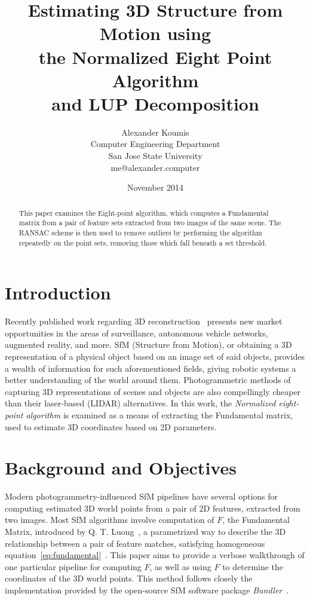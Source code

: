 \documentclass[12pt]{article}
\begin{document}
\title{Estimating 3D Structure from Motion using\\
the Normalized Eight Point Algorithm\\
and LUP Decomposition\\}
\author{Alexander Koumis\\
Computer Engineering Department\\
San Jose State University\\
me@alexander.computer}
\date{November 2014}
\maketitle

\begin{abstract}
This paper examines the Eight-point algorithm, which computes a Fundamental matrix from a pair of feature sets extracted from two images of the same scene. The RANSAC scheme is then used to remove outliers by performing the algorithm repeatedly on the point sets, removing those which fall beneath a set threshold.
\end{abstract}

\newpage

\section{Introduction}
Recently published work regarding 3D reconstruction~\cite{Hartley2004} presents new market opportunities in the areas of surveillance, autonomous vehicle networks, augmented reality, and more. SfM (Structure from Motion), or obtaining a 3D representation of a physical object based on an image set of said objects, provides a wealth of information for such aforementioned fields, giving robotic systems a better understanding of the world around them. Photogrammetric methods of capturing 3D representations of scenes and objects are also compellingly cheaper than their laser-based (LIDAR) alternatives.
In this work, the \textit{Normalized eight-point algorithm} is examined as a means of extracting the Fundamental matrix, used to estimate 3D coordinates based on 2D parameters.

\section{Background and Objectives}
Modern photogrammetry-influenced SfM pipelines have several options for computing estimated 3D world points from a pair of 2D features, extracted from two images. Most SfM algorithms involve computation of $F$, the Fundamental Matrix, introduced by Q. T. Luong~\cite{AICPub329:1992}, a parametrized way to describe the 3D relationship between a pair of feature matches, satisfying homogeneous equation~\eqref{eq:fundamental}~\cite{Hartley2004}. This paper aims to provide a verbose walkthrough of one particular pipeline for computing $F$, as well as using $F$ to determine the coordinates of the 3D world points. This method follows closely the implementation provided by the open-source SfM software package \textit{Bundler}~\cite{NoahSnavely}.
\end{document}
